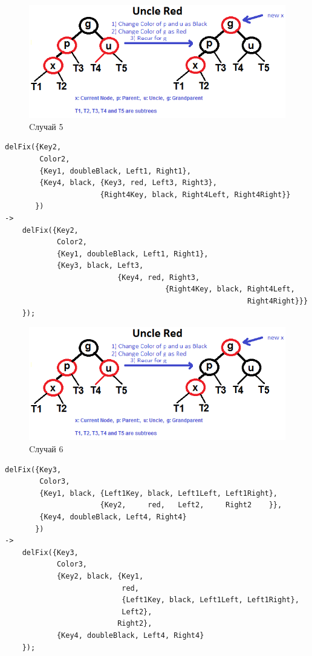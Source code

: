 			\begin{figure}[H]
				\centering
				\includegraphics[width=\textwidth]{img/tan-aus.png}
				\caption{Cлучай 5}
			\end{figure}
			\begin{lstlisting}
delFix({Key2,																		
		Color2,																		
		{Key1, doubleBlack, Left1, Right1},											
		{Key4, black, {Key3, red, Left3, Right3}, 									
					  {Right4Key, black, Right4Left, Right4Right}}					
	   })																			
->																					
	delFix({Key2,																	
		    Color2,																	
		    {Key1, doubleBlack, Left1, Right1},										
		    {Key3, black, Left3, 													
		    			  {Key4, red, Right3,										 
		    						 {Right4Key, black, Right4Left, 				
		    						 					Right4Right}}}				
	});																				
			\end{lstlisting}
			
			\begin{figure}[H]
				\centering
				\includegraphics[width=\textwidth]{img/tan-aus.png}
				\caption{Cлучай 6}
			\end{figure}
			\begin{lstlisting}
delFix({Key3,																		
		Color3,																		
		{Key1, black, {Left1Key, black, Left1Left, Left1Right}, 					
					  {Key2, 	 red,   Left2, 	   Right2    }},					
		{Key4, doubleBlack, Left4, Right4}											
	   })																			
->																					
	delFix({Key3, 																	
			Color3,																	
			{Key2, black, {Key1, 													
						   red, 													
						   {Left1Key, black, Left1Left, Left1Right},				
						   Left2},													
						  Right2},													
			{Key4, doubleBlack, Left4, Right4}										
	});																				
			\end{lstlisting}
			
